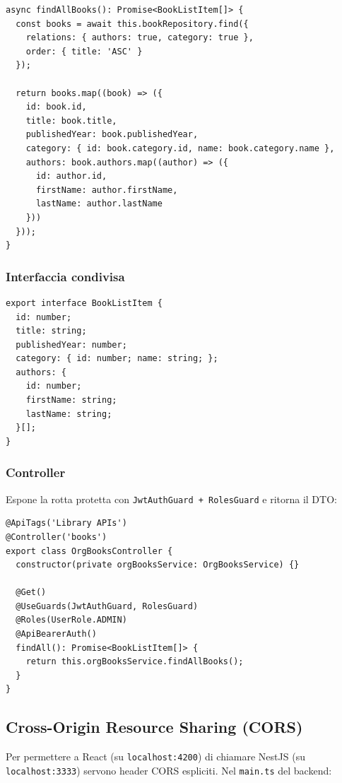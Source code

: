 \documentclass[11pt,a4paper]{article}
\begin{document}
\begin{lstlisting}[language=tsx]
async findAllBooks(): Promise<BookListItem[]> {
  const books = await this.bookRepository.find({
    relations: { authors: true, category: true },
    order: { title: 'ASC' }
  });

  return books.map((book) => ({
    id: book.id,
    title: book.title,
    publishedYear: book.publishedYear,
    category: { id: book.category.id, name: book.category.name },
    authors: book.authors.map((author) => ({
      id: author.id,
      firstName: author.firstName,
      lastName: author.lastName
    }))
  }));
}
\end{lstlisting}

\subsubsection{Interfaccia condivisa}
\begin{lstlisting}[language=tsx]
export interface BookListItem {
  id: number;
  title: string;
  publishedYear: number;
  category: { id: number; name: string; };
  authors: {
    id: number;
    firstName: string;
    lastName: string;
  }[];
}
\end{lstlisting}

\subsubsection{Controller}
Espone la rotta protetta con \texttt{JwtAuthGuard + RolesGuard} e ritorna il DTO:

\begin{lstlisting}[language=tsx]
@ApiTags('Library APIs')
@Controller('books')
export class OrgBooksController {
  constructor(private orgBooksService: OrgBooksService) {}

  @Get()
  @UseGuards(JwtAuthGuard, RolesGuard)
  @Roles(UserRole.ADMIN)
  @ApiBearerAuth()
  findAll(): Promise<BookListItem[]> {
    return this.orgBooksService.findAllBooks();
  }
}
\end{lstlisting}

\subsection{Cross-Origin Resource Sharing (CORS)}

Per permettere a React (su \texttt{localhost:4200}) di chiamare NestJS (su \texttt{localhost:3333}) servono header CORS espliciti. Nel \texttt{main.ts} del backend:
\end{document}
